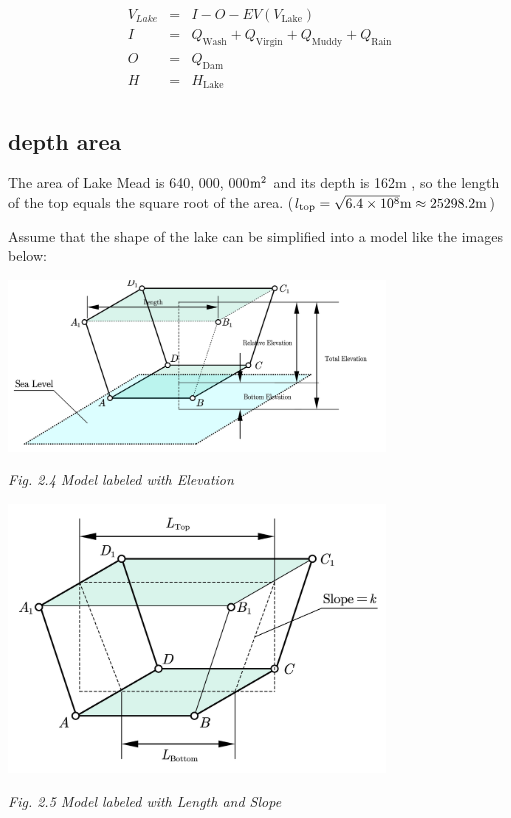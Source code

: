 \documentclass[12pt]{article}
\theoremstyle{definition}
\theoremstyle{remark}
\numberwithin{equation}{section}
\begin{document}
		$$\begin{array}{rcl}
			V_{Lake}&=&I-O-EV(V_{\text{Lake}})\\
			I&=&Q_{\text{Wash}}+Q_{\text{Virgin}}+Q_{\text{Muddy}}+Q_{\text{Rain}}\\
			O&=&Q_{\text{Dam}}\\
			H&=&H_{\text{Lake}}\\
		\end{array}$$
		\subsection{depth area}

	The area of Lake Mead is 640, 000, 000$\rm{m}^2$ and its depth is 162$\text{m}$ \cite{Lake Mead}, so the length of the top equals the square root of the area. ($l_{\text{top}}=\sqrt{6.4\times{10^8}} \rm{m}\approx25298.2\rm{m}$)

	Assume that the shape of the lake can be simplified into a model like the images below:
	
	\begin{center}
		\includegraphics[width=10cm]{2.4 Model labeled with Elevation.jpg}
		
		\small\textit{Fig. 2.4 Model labeled with Elevation}
		
		
		\includegraphics[width=10cm]{2.5 Model labeled with Length and Slope.jpg}
		
		\small\textit{Fig. 2.5 Model labeled with Length and Slope}
	\end{center}
\end{document}

